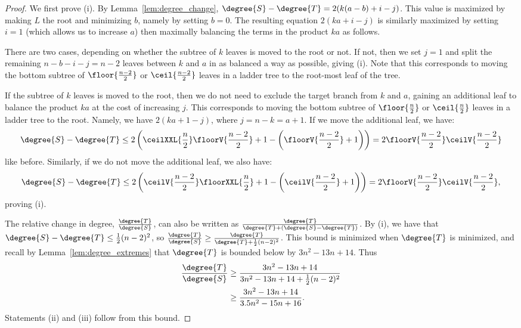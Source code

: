 \documentclass{amsart}
\begin{document}
\begin{proof}
	We first prove (i).
	By Lemma~\ref{lem:degree_change}, $\degree{S} - \degree{T} = 2(k(a-b) + i - j)$.
	This value is maximized by making $L$ the root and minimizing $b$, namely by setting $b=0$.
	The resulting equation $2(ka + i - j)$ is similarly maximized by setting $i=1$ (which allows us to increase $a$) then maximally balancing the terms in the product $ka$ as follows.

	There are two cases, depending on whether the subtree of $k$ leaves is moved to the root or not.
    If not, then we set $j=1$ and split the remaining $n-b-i-j = n-2$ leaves between $k$ and $a$ in as balanced a way as possible, giving (i).
	Note that this corresponds to moving the bottom subtree of $\floor{\frac{n-2}{2}}$ or $\ceil{\frac{n-2}{2}}$ leaves in a ladder tree to the root-most leaf of the tree.

	If the subtree of $k$ leaves is moved to the root, then we do not need to exclude the target branch from $k$ and $a$, gaining an additional leaf to balance the product $ka$ at the cost of increasing $j$.
	This corresponds to moving the bottom subtree of $\floor{\frac{n}{2}}$ or $\ceil{\frac{n}{2}}$ leaves in a ladder tree to the root.
	Namely, we have $2(ka + 1 - j)$, where $j = n - k = a + 1$.
	If we move the additional leaf, we have:
$$\degree{S} - \degree{T} \le 2\left(\ceilXXL{\frac{n}{2}}\floorV{\frac{n-2}{2}}  + 1 - \left(\floorV{\frac{n-2}{2}} + 1\right)\right) = 2\floorV{\frac{n-2}{2}}\ceilV{\frac{n-2}{2}}$$
like before.
Similarly, if we do not move the additional leaf, we also have:
$$\degree{S} - \degree{T} \le 2 \left(\ceilV{\frac{n-2}{2}}\floorXXL{\frac{n}{2}} +1 -  \left(\ceilV{\frac{n-2}{2}} + 1\right)\right) = 2\floorV{\frac{n-2}{2}}\ceilV{\frac{n-2}{2}},$$
proving (i).

The relative change in degree, $\frac{\degree{T}}{\degree{S}}$, can also be written as $\frac{\degree{T}}{\degree{T} + (\degree{S} - \degree{T})}$.
By (i), we have that $\degree{S} - \degree{T} \le \frac{1}{2} (n-2)^2$,
so $\frac{\degree{T}}{\degree{S}} \ge \frac{\degree{T}}{\degree{T} + \frac{1}{2} (n-2)^2} $.
This bound is minimized when $\degree{T}$ is minimized, and recall by Lemma~\ref{lem:degree_extremes} that $\degree{T}$ is bounded below by $3n^2 - 13n + 14$.
	Thus
	\begin{align*}
		\frac{\degree{T}}{\degree{S}} &\ge \frac{3n^2 - 13n + 14}{3n^2 - 13n + 14 + \frac{1}{2}(n-2)^2} \\
		&\ge \frac{3n^2 - 13n + 14}{3.5n^2 - 15n + 16}.
	\end{align*}
	Statements (ii) and (iii) follow from this bound.

\end{proof}
\end{document}
